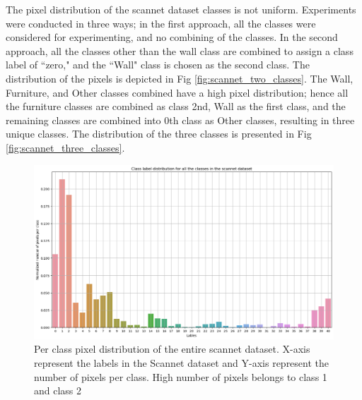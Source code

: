 	The pixel distribution of the scannet dataset classes is not uniform. Experiments were conducted in three ways; in the first approach, all the classes were considered for experimenting, and no combining of the classes. In the second approach, all the classes other than the wall class are combined to assign a class label of ``zero," and the ``Wall" class is chosen as the second class. The distribution of the pixels is depicted in Fig \ref{fig:scannet_two_classes}.
	The Wall, Furniture, and Other classes combined have a high pixel distribution; hence all the furniture classes are combined as class 2nd, Wall as the first class, and the remaining classes are combined into 0th class as Other classes, resulting in three unique classes. The distribution of the three classes is presented in Fig \ref{fig:scannet_three_classes}.
    
    \begin{figure}
    	\centering
    	\includegraphics[width=13cm]{images/scannet_data_class_distribution.png}
    	\caption{Per class pixel distribution of the entire scannet dataset. X-axis represent the labels in the Scannet dataset and Y-axis represent the number of pixels per class. High number of pixels belongs to class 1 and class 2}
    	\label{fig:scannet_class}
    \end{figure} 
    
